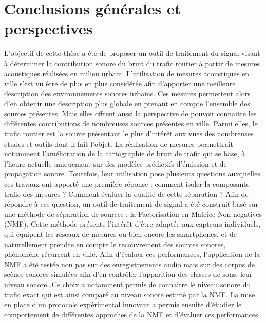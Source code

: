 \chapter*{Conclusions générales et perspectives}
\label{chap:concl}

L'objectif de cette thèse a été de proposer un outil de traitement du signal visant à déterminer la contribution sonore du bruit du trafic routier à partir de mesures acoustiques réalisées en milieu urbain. 
L'utilisation de mesures acoustiques en ville s'est vu être de plus en plus considérée afin d'apporter une meilleure description des environnements sonores urbains. Ces mesures permettent alors d'en obtenir une description plus globale en prenant en compte l'ensemble des sources présentes. Mais elles offrent aussi la perspective de pouvoir connaitre les différentes contributions de nombreuses sources présentes en ville. Parmi elles, le trafic routier est la source présentant le plus d'intérêt aux vues des nombreuses études et outils dont il fait l'objet. La réalisation de mesures permettrait notamment l'amélioration de la cartographie de bruit de trafic qui se base, à l'heure actuelle uniquement sur des modèles prédictifs d'émission et de propagation sonore. Toutefois, leur utilisation pose plusieurs questions auxquelles ces travaux ont apporté une première réponse : comment isoler la composante trafic des mesures ? Comment évaluer la qualité de cette séparation ? 
Afin de répondre à ces question, un outil de traitement de signal a été construit basé sur une méthode de séparation de sources : la Factorisation en Matrice Non-négatives (NMF). Cette méthode présente l'intérêt d'être adaptée aux capteurs individuels, qui équipent les réseaux de mesures ou bien encore les smartphones, et de naturellement prendre en compte le recouvrement des sources sonores, phénomène récurrent en ville.
Afin d'évaluer ces performances, l'application de la NMF a été testée non pas sur des enregistrements audio mais sur des corpus de scènes sonores simulées afin d'en contrôler l'apparition des classes de sons, leur niveau sonore\dots Ce choix a notamment permis de connaitre le niveau sonore du trafic exact qui est ainsi comparé au niveau sonore estimé par la NMF. La mise en place d'un protocole expérimental innovant a permis ensuite d'étudier le comportement de différentes approches de la NMF et d'évaluer ces performances.

